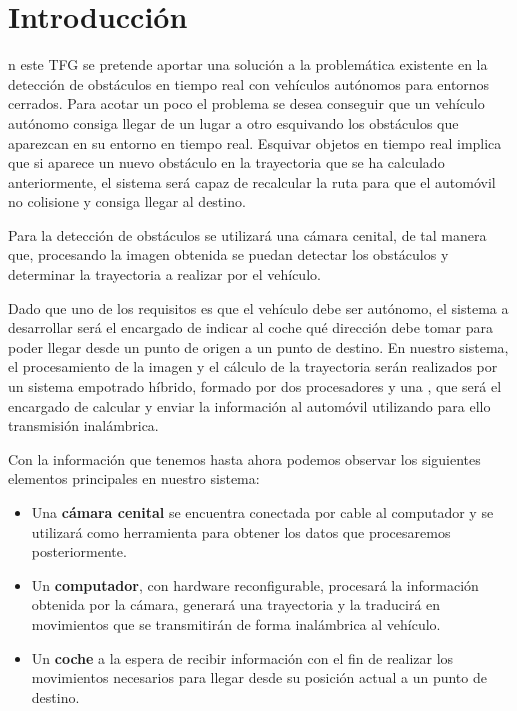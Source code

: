 \pagestyle{fancy}
\lhead[]{\leftmark}
\rhead[\rightmark]{}

\chapter{Introducción}

n este \ac{TFG} se pretende aportar una solución a la problemática existente en la detección de obstáculos en tiempo real con vehículos autónomos para entornos cerrados.
Para acotar un poco el problema se desea conseguir que un vehículo autónomo consiga llegar de un lugar a otro esquivando los obstáculos que aparezcan en su entorno en tiempo real. Esquivar objetos en tiempo real implica que si aparece un nuevo obstáculo en la trayectoria que se ha calculado anteriormente, el sistema será capaz de recalcular la ruta para que el automóvil no colisione y consiga llegar al destino.

Para la detección de obstáculos se utilizará una cámara cenital, de tal manera que, procesando la imagen obtenida se puedan detectar los obstáculos y determinar la trayectoria a realizar por el vehículo. 

Dado que uno de los requisitos es que el vehículo debe ser autónomo, el sistema a desarrollar será el encargado de indicar al coche qué dirección debe tomar para poder llegar desde un punto de origen a un punto de destino. En nuestro sistema, el procesamiento de la imagen y el cálculo de la trayectoria serán realizados por un sistema empotrado híbrido, formado por dos procesadores  y una , que será el encargado de calcular y enviar la información al automóvil utilizando para ello transmisión inalámbrica. 

Con la información que tenemos hasta ahora podemos observar los siguientes elementos principales en nuestro sistema:

\begin{itemize}
\item Una \textbf{cámara cenital} se encuentra conectada por cable al computador y se utilizará como herramienta para obtener los datos que procesaremos posteriormente.
\item Un \textbf{computador}, con hardware reconfigurable, procesará la información obtenida por la cámara, generará una trayectoria y la traducirá en movimientos que se transmitirán de forma inalámbrica al vehículo.
\item Un \textbf{coche} a la espera de recibir información con el fin de realizar los movimientos necesarios para llegar desde su posición actual a un punto de destino.
\end{itemize}

